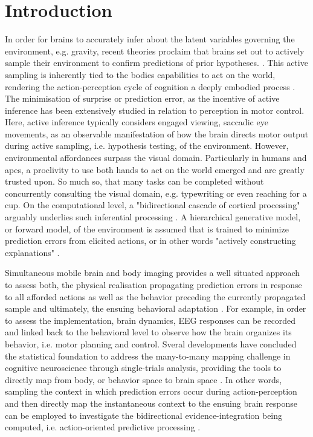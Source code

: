 \section{Introduction}
In order for brains to accurately infer about the latent variables governing the environment, e.g. gravity, recent theories proclaim that brains set out to actively sample their environment to confirm predictions of prior hypotheses. \cites{Clark2013, Friston2010, Rao1999}. This active sampling is inherently tied to the bodies capabilities to act on the world, rendering the action-perception cycle of cognition a deeply embodied process \cite{Friston2012}. The minimisation of surprise or prediction error, as the incentive of active inference has been extensively studied in relation to perception in motor control. Here, active inference typically considers engaged viewing, saccadic eye movements, as an observable manifestation of how the brain directs motor output during active sampling, i.e. hypothesis testing, of the environment. However, environmental affordances surpass the visual domain. Particularly in humans and apes, a proclivity to use both hands to act on the world emerged and are greatly trusted upon. So much so, that many tasks can be completed without concurrently consulting the visual domain, e.g. typewriting or even reaching for a cup. On the computational level, a "bidirectional cascade of cortical processing" arguably underlies such inferential processing \cite{Clark2013}. A hierarchical generative model, or forward model, of the environment is assumed that is trained to minimize prediction errors from elicited actions, or in other words "actively constructing explanations" \cite{Wolpert2011, Friston2018}. 

Simultaneous mobile brain and body imaging provides a well situated approach to assess both, the physical realisation propagating prediction errors in response to all afforded actions as well as the behavior preceding the currently propagated sample and ultimately, the ensuing behavioral adaptation \cites{Gramann2014, Makeig2009}. For example, in order to assess the implementation, brain dynamics, EEG responses can be recorded and linked back to the behavioral level to observe how the brain organizes its behavior, i.e. motor planning and control. Sveral developments have concluded the statistical foundation to address the many-to-many mapping challenge in cognitive neuroscience through single-trials analysis, providing the tools to directly map from body, or behavior space to brain space \cites{Pernet2011, Bridwell2018, Friston1994b, Blankertz2011}. In other words, sampling the context in which prediction errors occur during action-perception and then directly map the instantaneous context to the ensuing brain response can be employed to investigate the bidirectional evidence-integration being computed, i.e. action-oriented predictive processing \cite{Clark2013}.